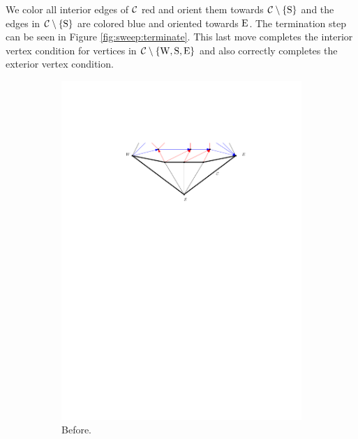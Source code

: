   We color all interior edges of $\mathcal{C}$ red and orient them towards $\mathcal{C} \setminus \left\lbrace {\mathrm{S}} \right\rbrace$ and the edges in $\mathcal{C} \setminus \left\lbrace {\mathrm{S}} \right\rbrace$ are colored blue and oriented towards $\mathrm{E}$. The termination step can be seen in Figure \ref{fig:sweep:terminate}. This last move completes the interior vertex condition for vertices in $\mathcal{C} \setminus \left\lbrace {\mathrm{W}, \mathrm{S}, \mathrm{E}} \right\rbrace$ and also correctly completes the exterior vertex condition.


  \begin{figure}[h]
    \centering
    \begin{subfigure}[b]{0.45 \textwidth}
        \includegraphics[width = \textwidth]{unifiedAlgo/img/sweep/terminateBefore.pdf}
        \caption{Before.}
    \end{subfigure}
    ~
    \begin{subfigure}[b]{0.45 \textwidth}

\end{subfigure}
\end{figure}
